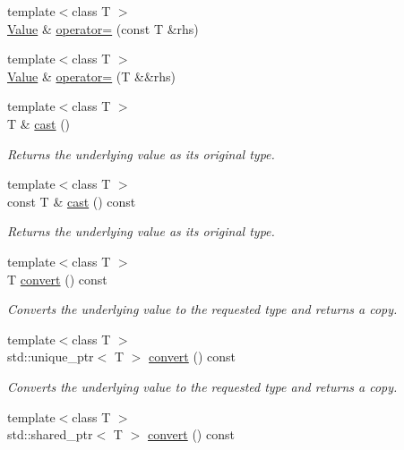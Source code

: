 \begin{DoxyCompactItemize}
{\footnotesize template$<$class T $>$ }\\\hyperlink{classdg_1_1deepcore_1_1_value}{Value} \& \hyperlink{classdg_1_1deepcore_1_1_value_aa3cc99e915c0c4fbfbdacab0db05fdbd}{operator=} (const T \&rhs)
\item 
{\footnotesize template$<$class T $>$ }\\\hyperlink{classdg_1_1deepcore_1_1_value}{Value} \& \hyperlink{classdg_1_1deepcore_1_1_value_af426f8deabb1a47fcdff5d4c99724c0c}{operator=} (T \&\&rhs)
\item 
{\footnotesize template$<$class T $>$ }\\T \& \hyperlink{classdg_1_1deepcore_1_1_value_a4fbdb5c7d41a79a10013c76e5791bdea}{cast} ()
\begin{DoxyCompactList}\small\item\em Returns the underlying value as its original type. \end{DoxyCompactList}\item 
{\footnotesize template$<$class T $>$ }\\const T \& \hyperlink{classdg_1_1deepcore_1_1_value_a997ca31ac2e3d60f9811ba8bfc31210c}{cast} () const 
\begin{DoxyCompactList}\small\item\em Returns the underlying value as its original type. \end{DoxyCompactList}\item 
{\footnotesize template$<$class T $>$ }\\T \hyperlink{classdg_1_1deepcore_1_1_value_a00280515d0f39ac97cba90b8b03b88ec}{convert} () const 
\begin{DoxyCompactList}\small\item\em Converts the underlying value to the requested type and returns a copy. \end{DoxyCompactList}\item 
{\footnotesize template$<$class T $>$ }\\std\+::unique\+\_\+ptr$<$ T $>$ \hyperlink{classdg_1_1deepcore_1_1_value_afca95e59572250a29d2541e225216b00}{convert} () const 
\begin{DoxyCompactList}\small\item\em Converts the underlying value to the requested type and returns a copy. \end{DoxyCompactList}\item 
{\footnotesize template$<$class T $>$ }\\std\+::shared\+\_\+ptr$<$ T $>$ \hyperlink{classdg_1_1deepcore_1_1_value_ace42fd82b33e8bd99181853a5344cc94}{convert} () const 

\end{DoxyCompactItemize}
